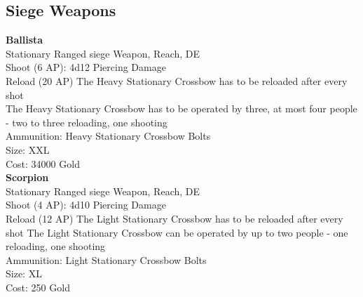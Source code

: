 \subsection{Siege Weapons}\label{subsec:siegeWeapons}
\textbf{Ballista}\label{weapon:ballista}\\
Stationary Ranged siege Weapon,  Reach, DE\\
Shoot (6 AP): 4d12 Piercing Damage\\
Reload (20 AP) The Heavy Stationary Crossbow has to be reloaded after every shot\\
The Heavy Stationary Crossbow has to be operated by three, at most four people - two to three reloading, one shooting\\
Ammunition: Heavy Stationary Crossbow Bolts\\
Size: XXL\\
Cost: 34000 Gold\\

\textbf{Scorpion}\label{weapon:scorpion}\\
Stationary Ranged siege Weapon,  Reach, DE\\
Shoot (4 AP): 4d10 Piercing Damage\\
Reload (12 AP) The Light Stationary Crossbow has to be reloaded after every shot
The Light Stationary Crossbow can be operated by up to two people - one reloading, one shooting\\
Ammunition: Light Stationary Crossbow Bolts\\
Size: XL\\
Cost: 250 Gold\\
